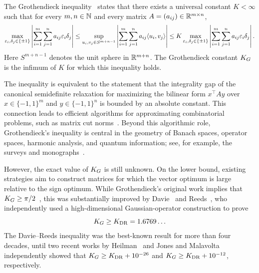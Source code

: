 The Grothendieck inequality~\cite{Gro53,LP68} states that there exists a universal constant $K<\infty$ such that for every $m,n\in\mathbb{N}$ and every matrix $A=(a_{ij})\in\mathbb{R}^{m\times n}$,
\begin{equation}\label{eq:grothendieck-ineq}
  \max_{\varepsilon_i,\delta_j\in\{\pm1\}}
  \left|\sum_{i=1}^m\sum_{j=1}^n a_{ij}\varepsilon_i\delta_j\right|
  \le
  \sup_{u_i,v_j\in S^{m+n-1}}
  \left|\sum_{i=1}^m\sum_{j=1}^n a_{ij}\langle u_i,v_j\rangle\right|
  \le
  K\max_{\varepsilon_i,\delta_j\in\{\pm1\}}
  \left|\sum_{i=1}^m\sum_{j=1}^n a_{ij}\varepsilon_i\delta_j\right|.
\end{equation}
Here $S^{m+n-1}$ denotes the unit sphere in $\mathbb{R}^{m+n}$.  The Grothendieck constant $K_G$ is the infimum of $K$ for which this inequality holds.

The inequality is equivalent to the statement that the integrality gap of the canonical semidefinite relaxation for maximizing the bilinear form $x^\top Ay$ over $x\in\{-1,1\}^m$ and $y\in\{-1,1\}^n$ is bounded by an absolute constant.
This connection leads to efficient algorithms for approximating combinatorial problems, such as matrix cut norms~\cite{AN06}.  Beyond this algorithmic role, Grothendieck's inequality is central in the geometry of Banach spaces, operator spaces, harmonic analysis, and quantum information; see, for example, the surveys and monographs~\cite{KN11,pisier2011grothendieckstheorempastpresent,DFS08}.

However, the exact value of $K_G$ is still unknown.
On the lower bound, existing strategies aim to construct matrices for which the vector optimum is large relative to the sign optimum.
While Grothendieck's original work implies that $K_G \geq \pi/2$~\cite{Gro53}, this was substantially improved by Davie~\cite{Davie1984LowerBoundKG} and Reeds~\cite{Reeds1991LowerBoundKG}, who independently used a high-dimensional Gaussian-operator construction to prove
\[
K_G
\geq K_{\mathrm{DR}} = 1.6769\ldots
\]
The Davie--Reeds inequality was the best-known result for more than four decades, until two recent works by
Heilman~\cite{heilman2026lowerboundgrothendiecksconstant} and Jones and Malavolta~\cite{jones2026grothendieckconstantstrictlylarger} independently showed that $K_G \geq K_{\mathrm{DR}}+10^{-26}$
and $K_G \geq K_{\mathrm{DR}}+10^{-12}$, respectively.




